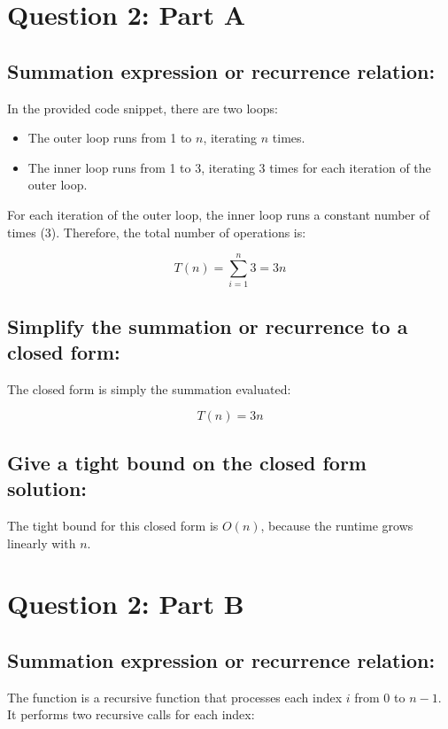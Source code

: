 \documentclass{article}
\begin{document}
\pagebreak
\section*{Question 2: Part A}
\subsection*{Summation expression or recurrence relation:}

In the provided code snippet, there are two loops:

\begin{itemize}
    \item The outer loop runs from 1 to \( n \), iterating \( n \) times.
    \item The inner loop runs from 1 to 3, iterating 3 times for each iteration of the outer loop.
\end{itemize}

For each iteration of the outer loop, the inner loop runs a constant number of times (3). Therefore, the total number of operations is:

\[T(n) = \sum_{i=1}^{n} 3 = 3n\]

\subsection*{Simplify the summation or recurrence to a closed form:}

The closed form is simply the summation evaluated:

\[T(n) = 3n\]

\subsection*{Give a tight bound on the closed form solution:}

The tight bound for this closed form is \( O(n) \), because the runtime grows linearly with \( n \).

\pagebreak
\section*{Question 2: Part B}
\subsection*{Summation expression or recurrence relation:}

The function  is a recursive function that processes each index \( i \) from 0 to \( n-1 \). It performs two recursive calls for each index:
\end{document}
